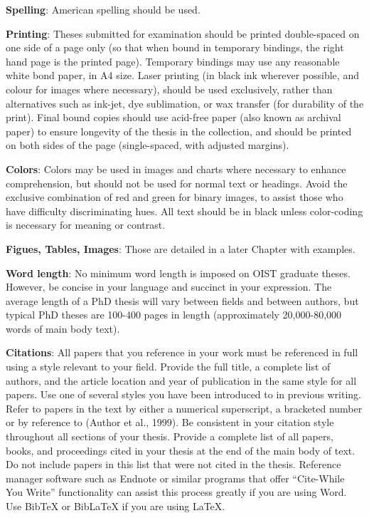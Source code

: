 \textbf{Spelling}: American spelling should be used.

\textbf{Printing}:  Theses submitted for examination should be printed double-spaced on one side of a page only (so that when bound in temporary bindings, the right hand page is the printed page).  Temporary bindings may use any reasonable white bond paper, in A4 size.  Laser printing (in black ink wherever possible, and colour for images where necessary), should be used exclusively, rather than alternatives such as ink-jet, dye sublimation, or wax transfer (for durability of the print).  Final bound copies should use acid-free paper (also known as archival paper) to ensure longevity of the thesis in the collection, and should be printed on both sides of the page (single-spaced, with adjusted margins).

\textbf{Colors}:  Colors may be used in images and charts where necessary to enhance comprehension, but should not be used for normal text or headings.  Avoid the exclusive combination of red and green for binary images, to assist those who have difficulty discriminating hues.  All text should be in black unless color-coding is necessary for meaning or contrast.

\textbf{Figues, Tables, Images}: Those are detailed in a later Chapter with examples.

\textbf{Word length}:  No minimum word length is imposed on OIST graduate theses.  However, be concise in your language and succinct in your expression.  The average length of a PhD thesis will vary between fields and between authors, but typical PhD theses are 100-400 pages in length (approximately 20,000-80,000 words of main body text).  

\textbf{Citations}:  All papers that you reference in your work must be referenced in full using a style relevant to your field. Provide the full title, a complete list of authors, and the article location and year of publication in the same style for all papers. Use one of several styles you have been introduced to in previous writing.  Refer to papers in the text by either a numerical superscript, a bracketed number or by reference to (Author et al., 1999).  Be consistent in your citation style throughout all sections of your thesis.  Provide a complete list of all papers, books, and proceedings cited in your thesis at the end of the main body of text.  Do not include papers in this list that were not cited in the thesis.  Reference manager software such as Endnote or similar programs that offer ``Cite-While You Write'' functionality can assist this process greatly if you are using Word. Use BibTeX or BibLaTeX if you are using LaTeX.

